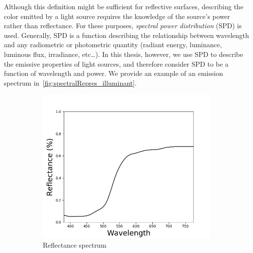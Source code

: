 Although this definition might be sufficient for reflective surfaces, describing the color emitted by a light source requires the knowledge of the source's power rather than reflectance. For these purposes, \emph{spectral power distribution} (SPD) is used. Generally, SPD is a function describing the relationship between wavelength and any radiometric or photometric quantity (radiant energy, luminance, luminous flux, irradiance, etc\ldots). In this thesis, however, we use SPD to describe the emissive properties of light sources, and therefore consider SPD to be a function of wavelength and power. We provide an example of an emission spectrum in~\cref{fig:spectralRepres_illuminant}.

\begin{figure}[t]
	\centering
	\begin{subfigure}[t]{0.31\textwidth}	
		\captionsetup{justification=centering}
		\includegraphics[width=\linewidth]{img/spectralRepres_reflectance.png}
		\caption{Reflectance spectrum}
		\label{fig:spectralRepres_reflectance}
	\end{subfigure}
	\begin{subfigure}[t]{0.31\textwidth}
	\captionsetup{justification=centering}

\end{subfigure}
\end{figure}
